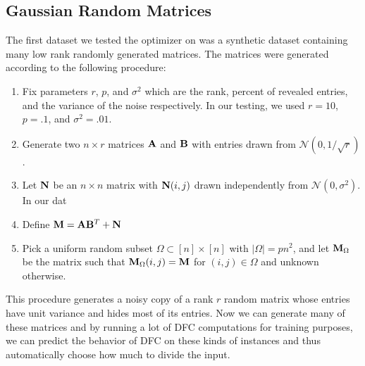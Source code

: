 \subsection{Gaussian Random Matrices}
The first dataset we tested the optimizer on was a synthetic dataset containing many low rank randomly generated matrices. The matrices were generated according to the following procedure: 
\begin{enumerate}
\item Fix parameters $r$, $p$, and $\sigma^2$ which are the rank, percent of revealed entries, and the variance of the noise respectively. In our testing, we used $r = 10$, $p = .1$, and $\sigma^2 = .01$. 
\item Generate two $n \times r$ matrices ${\bf A}$ and ${\bf B}$ with entries drawn from $\mathcal{N}(0,1/\sqrt{r})$. 
\item Let ${\bf N}$ be an $n \times n$ matrix with ${\bf N}(i,j)$ drawn independently from $\mathcal{N}(0,\sigma^2)$. In our dat
\item Define ${\bf M} = {\bf A}{\bf B}^T + {\bf N}$
\item Pick a uniform random subset $\Omega \subset [n] \times [n]$ with $|\Omega| = pn^2$, and let ${\bf M}_{\Omega}$ be the matrix such that ${\bf M}_{\Omega}(i,j) = {\bf M}$ for $(i,j) \in \Omega$ and unknown otherwise. 
\end{enumerate}
This procedure generates a noisy copy of a rank $r$ random matrix whose entries have unit variance and hides most of its entries. Now we can generate many of these matrices and by running a lot of DFC computations for training purposes, we can predict the behavior of DFC on these kinds of instances and thus automatically choose how much to divide the input. 

